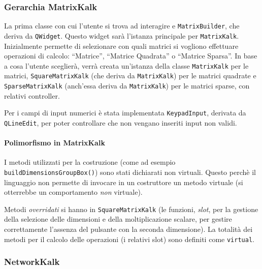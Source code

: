 \subsubsection{Gerarchia MatrixKalk}
La prima classe con cui l'utente si trova ad interagire e \texttt{MatrixBuilder}, che deriva da \texttt{QWidget}.
Questo widget sarà l'istanza principale per \texttt{MatrixKalk}. Inizialmente permette di selezionare con quali 
matrici si vogliono effettuare operazioni di calcolo: ``Matrice'', ``Matrice Quadrata'' o ``Matrice Sparsa''.
In base a cosa l'utente sceglierà, verrà creata un'istanza della classe \texttt{MatrixKalk} per le matrici, 
\texttt{SquareMatrixKalk} (che deriva da \texttt{MatrixKalk}) per le matrici quadrate e \texttt{SparseMatrixKalk} 
(anch'essa deriva da \texttt{MatrixKalk}) per le matrici sparse, con relativi controller.\par
Per i campi di input numerici è stata implementata \texttt{KeypadInput}, derivata da \texttt{QLineEdit}, per poter controllare che non vengano inseriti
input non validi.

\paragraph{Polimorfismo in MatrixKalk} I metodi utilizzati per la costruzione (come ad esempio \texttt{buildDimensionsGroupBox()}) sono 
stati dichiarati non virtuali. Questo
perchè il linguaggio non permette di invocare in un costruttore un metodo virtuale (si otterrebbe un comportamento \emph{non} virtuale). \par
Metodi \emph{overridati} si hanno in \texttt{SquareMatrixKalk} (le funzioni, \emph{slot}, per la gestione della selezione delle dimensioni
e della moltiplicazione scalare, per gestire correttamente l'assenza del pulsante con la seconda dimensione). La totalità dei 
metodi per il calcolo delle operazioni (i relativi slot) sono definiti come \texttt{virtual}.

\subsubsection{NetworkKalk}